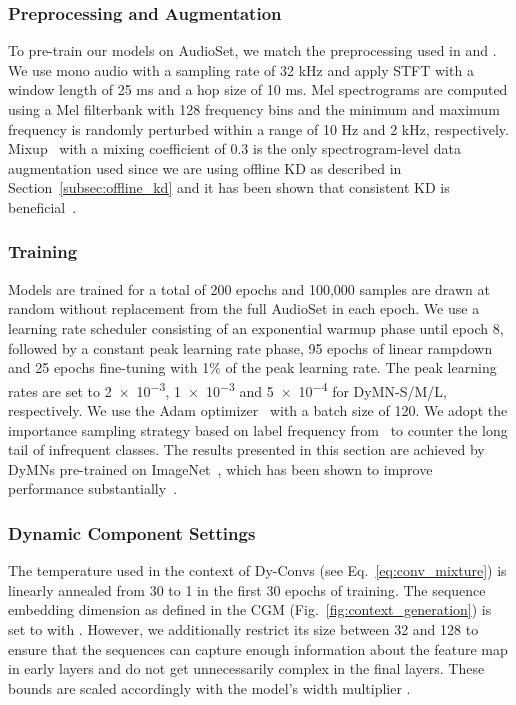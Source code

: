 \documentclass[lettersize,journal]{IEEEtran}
\begin{document}
\subsubsection{Preprocessing and Augmentation} To pre-train our models on AudioSet, we match the preprocessing used in \cite{Koutini21Passt} and \cite{Schmid22Efficient}. We use mono audio with a sampling rate of 32 kHz and apply STFT with a window length of 25 ms and a hop size of 10 ms. Mel spectrograms are computed using a Mel filterbank with 128 frequency bins and the minimum and maximum frequency is randomly perturbed within a range of 10 Hz and 2 kHz, respectively. Mixup~\cite{Zhang18mixup} with a mixing coefficient of 0.3 is the only spectrogram-level data augmentation used since we are using offline KD as described in Section~\ref{subsec:offline_kd} and it has been shown that consistent KD is beneficial~\cite{Beyer21Consistent, Schmid22Efficient}. 

\subsubsection{Training} Models are trained for a total of 200 epochs and 100,000 samples are drawn at random without replacement from the full AudioSet in each epoch. We use a learning rate scheduler consisting of an exponential warmup phase until epoch 8, followed by a constant peak learning rate phase, 95 epochs of linear rampdown and 25 epochs fine-tuning with 1\% of the peak learning rate. The peak learning rates are set to \num{2e-3}, \num{1e-3} and \num{5e-4} for DyMN-S/M/L, respectively. We use the Adam optimizer~\cite{kingma2014adam} with a batch size of 120. We adopt the importance sampling strategy based on label frequency from~\cite{Koutini21Passt} to counter the long tail of infrequent classes. The results presented in this section are achieved by DyMNs pre-trained on ImageNet~\cite{Deng09ImageNet}, which has been shown to improve performance substantially~\cite{Gong21PSLA}. 

\subsubsection{Dynamic Component Settings} The temperature  used in the context of Dy-Convs (see Eq.~\ref{eq:conv_mixture}) is linearly annealed from 30 to 1 in the first 30 epochs of training. The sequence embedding dimension  as defined in the CGM (Fig.~\ref{fig:context_generation}) is set to  with . However, we additionally restrict its size between 32 and 128 to ensure that the sequences can capture enough information about the feature map in early layers  and do not get unnecessarily complex in the final layers. These bounds are scaled accordingly with the model's width multiplier . 
\end{document}

